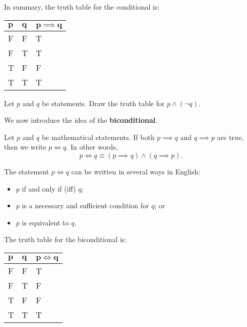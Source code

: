 In summary, the truth table for the conditional is:
\begin{table}[h]
    \centering
    \begin{tabular}{|l|l||l|}
        \hline
        $\boldsymbol{p}$ & $\boldsymbol{q}$ & $\boldsymbol{p\implies q}$ \\ \hline
        F   & F   & T             \\ \hline
        F   & T   & T             \\ \hline
        T   & F   & F             \\ \hline
        T   & T   & T             \\ \hline
    \end{tabular}
\end{table}

\begin{exercise}
    Let $p$ and $q$ be statements. Draw the truth table for $p \land (\lnot q)$.
\end{exercise}

We now introduce the idea of the \textbf{biconditional}.
\begin{definition}
    Let $p$ and $q$ be mathematical statements. If both $p \implies q$ and $q \implies p$ are true, then we write $p \iff q$. In other words,
    \[
        p \iff q \equiv (p \implies q) \land (q \implies p).
    \]
\end{definition}
\begin{remark}
    The statement $p \iff q$ can be written in several ways in English:
    \begin{itemize}
        \item $p$ if and only if (iff) $q$;
        \item $p$ is a necessary and sufficient condition for $q$; or
        \item $p$ is equivalent to $q$.
    \end{itemize}
\end{remark}

The truth table for the biconditional is:
\begin{table}[h]
    \centering
    \begin{tabular}{|l|l||l|}
        \hline
        $\boldsymbol{p}$ & $\boldsymbol{q}$ & $\boldsymbol{p \iff q}$ \\ \hline
        F   & F   & T         \\ \hline
        F   & T   & F         \\ \hline
        T   & F   & F         \\ \hline
        T   & T   & T         \\ \hline
    \end{tabular}
\end{table}

